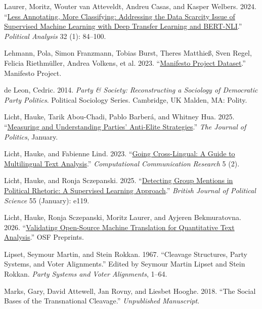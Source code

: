 \documentclass[12pt]{article}
\newlength{\cslhangindent}
\newenvironment{CSLReferences}[2]
  {\begin{list}{}{%
    \setlength{\itemindent}{0pt}
    \setlength{\leftmargin}{0pt}
    \setlength{\parsep}{0pt}
    \ifodd #1
      \setlength{\leftmargin}{\cslhangindent}
      \setlength{\itemindent}{-\cslhangindent}
    \fi
    \setlength{\itemsep}{#2\baselineskip}}}
  {\end{list}}
\begin{document}
\begin{CSLReferences}{1}{0}
Laurer, Moritz, Wouter van Atteveldt, Andreu Casas, and Kasper Welbers. 2024. {``\href{https://doi.org/10.1017/pan.2023.20}{Less Annotating, More Classifying: Addressing the Data Scarcity Issue of Supervised Machine Learning with Deep Transfer Learning and {BERT}-{NLI}}.''} \emph{Political Analysis} 32 (1): 84--100.

Lehmann, Pola, Simon Franzmann, Tobias Burst, Theres Matthieß, Sven Regel, Felicia Riethmüller, Andrea Volkens, et al. 2023. {``\href{https://doi.org/10.25522/MANIFESTO.MPDS.2023A}{Manifesto Project Dataset}.''} Manifesto Project.

de Leon, Cedric. 2014. \emph{Party \& Society: Reconstructing a Sociology of Democratic Party Politics}. Political Sociology Series. Cambridge, {UK} Malden, {MA}: Polity.

Licht, Hauke, Tarik Abou-Chadi, Pablo Barberá, and Whitney Hua. 2025. {``\href{https://doi.org/10.1086/730711}{Measuring and Understanding Parties' Anti-Elite Strategies}.''} \emph{The Journal of Politics}, January.

Licht, Hauke, and Fabienne Lind. 2023. {``\href{https://doi.org/10.5117/CCR2023.2.2.LICH}{Going Cross-Lingual: A Guide to Multilingual Text Analysis}.''} \emph{Computational Communication Research} 5 (2).

Licht, Hauke, and Ronja Sczepanski. 2025. {``\href{https://doi.org/10.1017/S0007123424000954}{Detecting Group Mentions in Political Rhetoric: A Supervised Learning Approach}.''} \emph{British Journal of Political Science} 55 (January): e119.

Licht, Hauke, Ronja Sczepanski, Moritz Laurer, and Ayjeren Bekmuratovna. 2026. {``\href{https://doi.org/10.31219/osf.io/9trjs}{Validating Open-Source Machine Translation for Quantitative Text Analysis}.''} {OSF} Preprints.

Lipset, Seymour Martin, and Stein Rokkan. 1967. {``Cleavage Structures, Party Systems, and Voter Alignments.''} Edited by Seymour Martin Lipset and Stein Rokkan. \emph{Party Systems and Voter Alignments}, 1--64.

Marks, Gary, David Attewell, Jan Rovny, and Liesbet Hooghe. 2018. {``The Social Bases of the Transnational Cleavage.''} \emph{Unpublished Manuscript}.


\end{CSLReferences}
\end{document}
